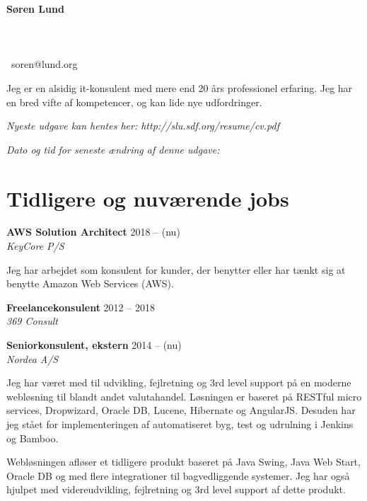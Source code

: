 \documentclass[a4paper,11pt]{article}
\newcommand\redacted{[skjult i online version]}
\newcommand\myaddressone{\redacted}
\newcommand\myaddresstwo{\redacted}
\newcommand\myphone{\redacted}
\begin{document}
\centerline{}
\bigskip

\begin{minipage}[b]{0.30\textwidth}
  \selectfont%
  \textbf{Søren Lund} \\
  \myaddressone \\
  \myaddresstwo \\
  \myphone \\
  \Email\ soren@lund.org
\end{minipage}%
\hfill
\begin{minipage}[b]{0.30\textwidth}
  \selectfont%
  Jeg er en alsidig it-konsulent med
  mere end 20 års professionel
  erfaring. Jeg har en bred vifte af
  kompetencer, og
  kan lide nye udfordringer.
\end{minipage}

\bigskip
\centerline{\small\textit{Nyeste udgave kan hentes her: http://slu.sdf.org/resume/cv.pdf}}
\centerline{\small\textit{Dato og tid for seneste ændring af denne udgave: }}

\section*{Tidligere og nuværende jobs}

\textbf{AWS Solution Architect} \hfill 2018 -- (nu) \\
\textsl{KeyCore P/S}

Jeg har arbejdet som konsulent for kunder, der benytter eller har
tænkt sig at benytte Amazon Web Services (AWS).

\smallskip

\textbf{Freelancekonsulent} \hfill 2012 -- 2018 \\
\textsl{369 Consult}

\smallskip

\textbf{Seniorkonsulent, ekstern} \hfill 2014 -- (nu) \\
\textsl{Nordea A/S}

Jeg har været med til udvikling, fejlretning og 3rd level support på
en moderne webløsning til blandt andet valutahandel. Løsningen er
baseret på RESTful micro services, Dropwizard, Oracle DB, Lucene,
Hibernate og AngularJS. Desuden har jeg stået for implementeringen af
automatiseret byg, test og udrulning i Jenkins og Bamboo.

Webløsningen afløser et tidligere produkt baseret på Java Swing, Java
Web Start, Oracle DB og med flere integrationer til bagvedliggende
systemer. Jeg har også hjulpet med videreudvikling, fejlretning og 3rd
level support af dette produkt.
\end{document}
